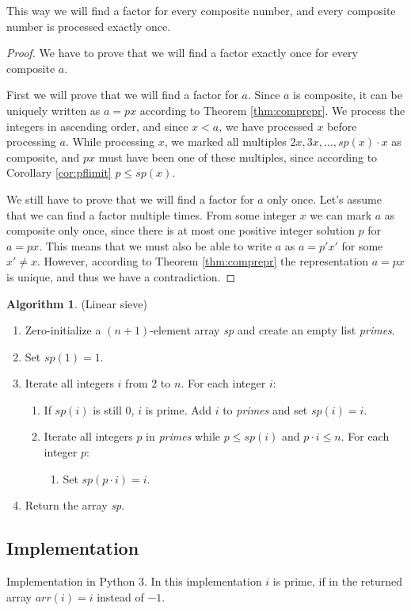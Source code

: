 \documentclass[12pt] {article}
\theoremstyle{plain}
\theoremstyle{definition}
\newtheorem{algo}[thm]{Algorithm}
\begin{document}
This way we will find a factor for every composite number, and every composite number is processed exactly once.

\begin{proof}
We have to prove that we will find a factor exactly once for every composite $a$.

First we will prove that we will find a factor for $a$. Since $a$ is composite, it can be uniquely written as $a = px$ according to Theorem \ref{thm:comprepr}. We process the integers in ascending order, and since $x < a$, we have processed $x$ before processing $a$. While processing $x$, we marked all multiples $2x, 3x, \dots, sp(x) \cdot x$ as composite, and $px$ must have been one of these multiples, since according to Corollary \ref{cor:pflimit} $p \leq sp(x)$.

We still have to prove that we will find a factor for $a$ only once. Let's assume that we can find a factor multiple times. From some integer $x$ we can mark $a$ as composite only once, since there is at most one positive integer solution $p$ for $a = px$. This means that we must also be able to write $a$ as $a = p'x'$ for some $x' \neq x$. However, according to Theorem \ref{thm:comprepr} the representation $a = px$ is unique, and thus we have a contradiction.
\end{proof}

\begin{algo} (Linear sieve)
\begin{enumerate}
\item Zero-initialize a $(n+1)$-element array \textit{sp} and create an empty list \textit{primes}.
\item Set $sp(1) = 1$.
\item Iterate all integers $i$ from 2 to $n$. For each integer $i$:
\begin{enumerate}
	\item If $sp(i)$ is still 0, $i$ is prime. Add $i$ to \textit{primes} and set $sp(i) = i$.
	\item Iterate all integers $p$ in \textit{primes} while $p \leq sp(i)$ and $p \cdot i \leq n$. For each integer $p$:
\begin{enumerate}
		\item Set $sp(p \cdot i) = i$.
\end{enumerate}
\end{enumerate}
\item Return the array \textit{sp}.
\end{enumerate}
\end{algo}

\subsection {Implementation}

Implementation in Python 3. In this implementation $i$ is prime, if in the returned array $arr(i) = i$ instead of $-1$.



\printbibliography
\end{document}
